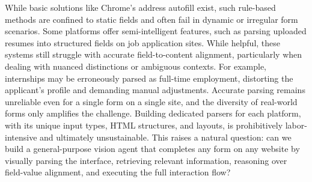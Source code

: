 \documentclass[sigconf, screen, review]{acmart}
\begin{document}
While basic solutions like Chrome’s address autofill exist, such rule-based methods are confined to static fields and often fail in dynamic or irregular form scenarios.
Some platforms offer semi-intelligent features, such as parsing uploaded resumes into structured fields on job application sites.
While helpful, these systems still struggle with accurate field-to-content alignment, particularly when dealing with nuanced distinctions or ambiguous contexts.
For example, internships may be erroneously parsed as full-time employment, distorting the applicant’s profile and demanding manual adjustments.
Accurate parsing remains unreliable even for a single form on a single site, and the diversity of real-world forms only amplifies the challenge. 
Building dedicated parsers for each platform, with its unique input types, HTML structures, and layouts, is prohibitively labor-intensive and ultimately unsustainable.
This raises a natural question: can we build a general-purpose vision agent that completes any form on any website by visually parsing the interface, retrieving relevant information, reasoning over field-value alignment, and executing the full interaction flow?



\end{document}
